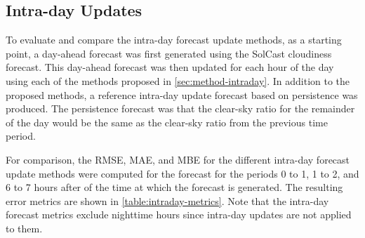 \subsection{Intra-day Updates}

To evaluate and compare the intra-day forecast update methods,
as a starting point, a day-ahead forecast was first generated using the
SolCast cloudiness forecast.
This day-ahead forecast was then updated for each hour of the day using each of the methods proposed in \cref{sec:method-intraday}.
In addition to the proposed methods, a reference intra-day update forecast based on persistence was produced.
The persistence forecast was that the clear-sky ratio for the remainder of the day would be the same as the clear-sky ratio from the previous time period.

For comparison, the RMSE, MAE, and MBE for the different intra-day forecast update methods were computed
for the forecast for the periods 0 to 1, 1 to 2, and 6 to 7 hours after of the time at which the forecast is generated.
The resulting error metrics are shown in \cref{table:intraday-metrics}.
Note that the intra-day forecast metrics exclude nighttime hours since intra-day updates are not applied to them.

